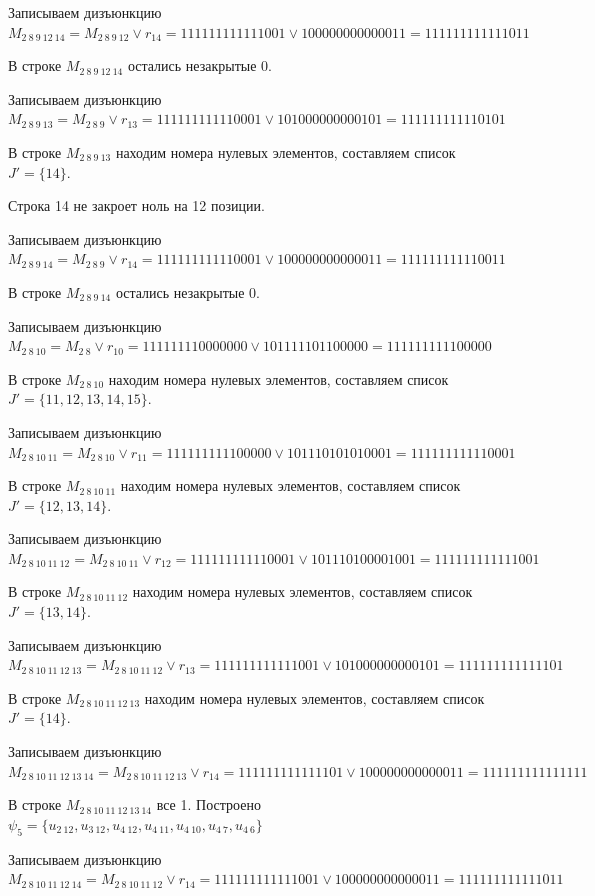 \documentclass{article}
\begin{document}
Записываем дизъюнкцию $M_{2\ 8\ 9\ 12\ 14} = M_{2\ 8\ 9\ 12}\lor r_{14} = 111111111111001 \lor 100000000000011 = 111111111111011$

В строке $M_{2\ 8\ 9\ 12\ 14}$ остались незакрытые 0.

Записываем дизъюнкцию $M_{2\ 8\ 9\ 13} = M_{2\ 8\ 9}\lor r_{13} = 111111111110001 \lor 101000000000101 = 111111111110101$

В строке $M_{2\ 8\ 9\ 13}$ находим номера нулевых элементов, составляем список $J' = \{14\}$.

Строка 14 не закроет ноль на 12 позиции.

Записываем дизъюнкцию $M_{2\ 8\ 9\ 14} = M_{2\ 8\ 9}\lor r_{14} = 111111111110001 \lor 100000000000011 = 111111111110011$

В строке $M_{2\ 8\ 9\ 14}$ остались незакрытые 0.

Записываем дизъюнкцию $M_{2\ 8\ 10} = M_{2\ 8}\lor r_{10} = 111111110000000 \lor 101111101100000 = 111111111100000$

В строке $M_{2\ 8\ 10}$ находим номера нулевых элементов, составляем список $J' = \{11, 12, 13, 14, 15\}$.

Записываем дизъюнкцию $M_{2\ 8\ 10\ 11} = M_{2\ 8\ 10}\lor r_{11} = 111111111100000 \lor 101110101010001 = 111111111110001$

В строке $M_{2\ 8\ 10\ 11}$ находим номера нулевых элементов, составляем список $J' = \{12, 13, 14\}$.

Записываем дизъюнкцию $M_{2\ 8\ 10\ 11\ 12} = M_{2\ 8\ 10\ 11}\lor r_{12} = 111111111110001 \lor 101110100001001 = 111111111111001$

В строке $M_{2\ 8\ 10\ 11\ 12}$ находим номера нулевых элементов, составляем список $J' = \{13, 14\}$.

Записываем дизъюнкцию $M_{2\ 8\ 10\ 11\ 12\ 13} = M_{2\ 8\ 10\ 11\ 12}\lor r_{13} = 111111111111001 \lor 101000000000101 = 111111111111101$

В строке $M_{2\ 8\ 10\ 11\ 12\ 13}$ находим номера нулевых элементов, составляем список $J' = \{14\}$.

Записываем дизъюнкцию $M_{2\ 8\ 10\ 11\ 12\ 13\ 14} = M_{2\ 8\ 10\ 11\ 12\ 13}\lor r_{14} = 111111111111101 \lor 100000000000011 = 111111111111111$

В строке $M_{2\ 8\ 10\ 11\ 12\ 13\ 14}$ все 1. Построено $\psi_{5} = \{u_{2\ 12},u_{3\ 12},u_{4\ 12},u_{4\ 11},u_{4\ 10},u_{4\ 7},u_{4\ 6}\}$

Записываем дизъюнкцию $M_{2\ 8\ 10\ 11\ 12\ 14} = M_{2\ 8\ 10\ 11\ 12}\lor r_{14} = 111111111111001 \lor 100000000000011 = 111111111111011$
\end{document}
